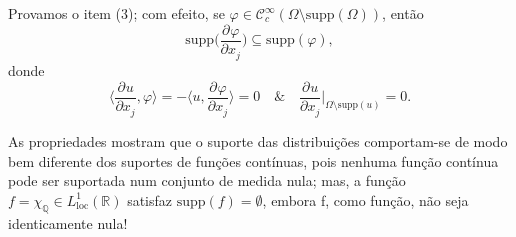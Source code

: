 \documentclass[../distribution_theory_notes.tex]{subfiles}
\begin{document}
\begin{proof*}
	Provamos o item (3); com efeito, se \(\varphi \in \mathcal{C}_{c}^{\infty}(\Omega \setminus{\mathrm{supp}(\Omega )})\), então
	\[
		\mathrm{supp}\biggl(\frac{\partial^{}\varphi }{\partial x_{j}^{}}\biggr)\subseteq \mathrm{supp}(\varphi ),
	\]
	donde
	\[
		\biggl\langle \frac{\partial^{}u}{\partial x_{j}^{}}, \varphi  \biggr\rangle = -\biggl\langle u, \frac{\partial^{}\varphi }{\partial x_{j}^{}} \biggr\rangle = 0 \quad\&\quad \frac{\partial^{}u}{\partial x_{j}^{}}|_{\Omega \setminus{\mathrm{supp}(u)}}=0.
	\]
\end{proof*}
\begin{tcolorbox}[
		skin=enhanced,
		title=Observação,
		fonttitle=\bfseries,
		colframe=black,
		colbacktitle=cyan!75!white,
		colback=cyan!15,
		colbacklower=black,
		coltitle=black,
		drop fuzzy shadow,
	]
	As propriedades mostram que o suporte das distribuições comportam-se de modo bem diferente dos suportes de funções contínuas, pois nenhuma função contínua pode ser suportada num conjunto de medida nula; mas, a função \(f=\chi_{\mathbb{Q}}\in L_{\mathrm{loc}}^{1}(\mathbb{R})\) satisfaz \(\mathrm{supp}(f) = \emptyset \), embora f, como função, não seja identicamente nula!
\end{tcolorbox}
\end{document}
